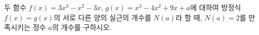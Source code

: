 두 함수 $f(x)=3x^3-x^2-3x$, $g(x)=x^3-4x^2+9x+a$에 대하여 방정식 $f(x)=g(x)$의 서로 다른 양의 실근의 개수를 $N(a)$라 할 때, $N(a)=2$를 만족시키는 정수 $a$의 개수를 구하시오.
